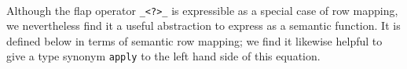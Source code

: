 \documentclass[authoryear, acmsmall, screen, review, nonacm]{acmart}
\begin{document}
\begin{code}
\AgdaSymbol{)))}\AgdaSpace{}%
\AgdaSymbol{=}\AgdaSpace{}%
\AgdaSymbol{(}\AgdaSpace{}%
\AgdaSpace{}%
\AgdaSymbol{(}\AgdaSpace{}%
\AgdaSpace{}%
\AgdaSymbol{))}\<%
\\
\>[0]\AgdaSpace{}%
\AgdaSymbol{\{}\AgdaSpace{}%
\AgdaSymbol{=}\AgdaSpace{}%
\AgdaSymbol{\}}\AgdaSpace{}%
\AgdaSymbol{\{}\AgdaSymbol{\}}\AgdaSpace{}%
\AgdaSpace{}%
\AgdaSpace{}%
\AgdaSymbol{=}\AgdaSpace{}%
\<%
\end{code}

Although the flap operator \verb!_<?>_! is expressible as a special case of row mapping, we nevertheless find it a useful abstraction to express as a semantic function. It is defined below in terms of semantic row mapping; we find it likewise helpful to give a type synonym \verb!apply! to the left hand side of this equation.
\end{document}

